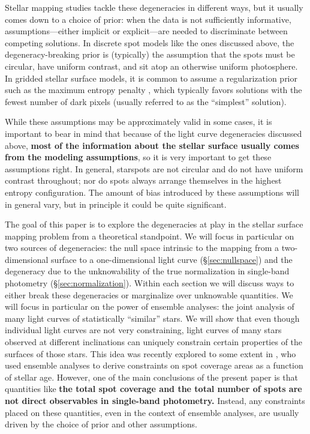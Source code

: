 \documentclass[modern,linenumbers]{aastex62}
\begin{document}
Stellar mapping studies tackle these degeneracies in different ways, but
it usually comes down to a choice of prior: when the data is not
sufficiently informative, assumptions---either implicit or explicit---are needed to discriminate
between competing solutions. In discrete spot models like the ones
discussed above, the degeneracy-breaking prior is (typically) the assumption that the
spots must be circular, have uniform contrast, and sit atop an otherwise
uniform photosphere. In gridded stellar surface models, it is common to
assume a regularization prior such as the maximum entropy penalty
\citep[e.g.,][]{Vogt1987}, which typically favors solutions with the fewest
number of dark pixels (usually referred to as the ``simplest'' solution).

While these assumptions may be approximately valid in some cases, it is
important to bear in mind that because of the light curve degeneracies discussed above,
\textbf{most of the information about the stellar surface usually comes from the modeling assumptions},
so it is very important to get these assumptions right. In general, starspots are not circular and do not have uniform
contrast throughout; nor do spots always arrange themselves in the highest
entropy configuration. The amount of bias introduced by these assumptions
will in general vary, but in principle it could be quite significant.


The goal of this paper is to explore the degeneracies at play in the
stellar surface mapping problem from a theoretical standpoint.
We will focus in particular on two sources of degeneracies: the
null space intrinsic to the mapping from a two-dimensional surface to
a one-dimensional light curve (\S\ref{sec:nullspace})
and the degeneracy due to the unknowability of the true normalization in
single-band photometry (\S\ref{sec:normalization}). Within each section we
will discuss ways to either break these degeneracies or marginalize
over unknowable quantities.
We will focus in particular on the power of ensemble analyses: the
joint analysis of many light curves of statistically ``similar''
stars. We will show that even though individual light curves are not very
constraining, light curves of many stars
observed at different inclinations can uniquely constrain certain
properties of the surfaces of those stars.
%
This idea was recently explored to some extent
in \citet{Morris2020}, who used ensemble analyses to derive constraints on
spot coverage areas as a function of stellar age. However, one of
the main conclusions of the present paper is that
quantities like \textbf{the
    total spot coverage and the total number of
    spots are not direct observables in single-band photometry.} Instead,
any constraints placed on these quantities, even in the context of
ensemble analyses, are usually driven by the choice of prior and other assumptions.
\end{document}
